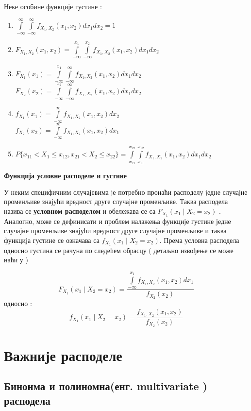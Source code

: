  
Неке особине функције густине :

\begin{enumerate}
\item  $ \int \limits_{-\infty}^{\infty}\int \limits_{-\infty}^{\infty} f_{X_1,X_2}(x_1,x_2)dx_1dx_2 = 1$
\item  $F_{X_1,X_2}(x_1,x_2) =  \int \limits_{-\infty}^{x_1}\int \limits_{-\infty}^{x_2} f_{X_1,X_2}(x_1,x_2)dx_1dx_2$
\item  $F_{X_1}(x_1) =  \int \limits_{-\infty}^{x_1}\int \limits_{-\infty}^{\infty} f_{X_1,X_2}(x_1,x_2)dx_1dx_2$ \\
$F_{X_2}(x_2) =  \int \limits_{-\infty}^{x_2}\int \limits_{-\infty}^{\infty} f_{X_1,X_2}(x_1,x_2)dx_1dx_2$ 
\item $f_{X_1}(x_1) =  \int \limits_{-\infty}^{\infty} f_{X_1,X_2}(x_1,x_2)dx_2$ \\
$f_{X_2}(x_2) =  \int \limits_{-\infty}^{\infty} f_{X_1,X_2}(x_1,x_2)dx_1$ 
\item $P \lbrace x_{11} < X_1 \leq x_{12}, x_{21}<X_2 \leq x_{22} \rbrace =  \int \limits_{x_{21}}^{x_{22}}\int \limits_{x_{11}}^{x_{12}} f_{X_1,X_2}(x_1,x_2)dx_1dx_2 $
	
\end{enumerate}


\textbf{Функција условне расподеле и густине}


У неким специфичним случајевима је потребно пронаћи расподелу једне случајне променљиве знајући вредност друге случајне променљиве. Таква расподела назива се \textbf{условном расподелом} и обележава се са $F_{X_1}(x_1 \mid X_2 = x_2)$ . Аналогно, може се дефинисати и проблем налажења функције густине једне случајне променљиве знајући вредност друге случајне променљиве и таква функција густине  се означава са $f_{X_1}(x_1 \mid X_2 = x_2 )$. Према \cite{verov4} условна расподела односно густина се рачуна по следећем обрасцу ( детаљно извођење се може наћи у \cite{verov4})

$$  F_{X_1}(x_1 \mid X_2 = x_2) = \frac{\int \limits_{-\infty}^{x_1} f_{X_1,X_2}(x_1,x_2)dx_1}{f_{X_2}(x_2)} $$
односно :
$$  f_{X_1}(x_1 \mid X_2 = x_2) = \frac{f_{X_1,X_2}(x_1,x_2)}{f_{X_2}(x_2)} $$




\section{Важније расподеле}
\subsection{Бинонма и полиномна(енг. multivariate ) расподела}

